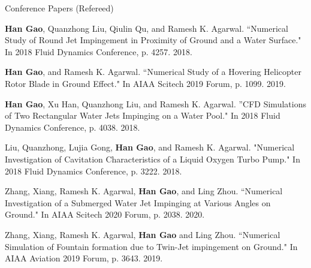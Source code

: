 \documentclass{resume} %
\begin{document}
\begin{rSection}{Conference Papers (Refereed)}

\item \textbf{Han Gao}, Quanzhong Liu, Qiulin Qu, and Ramesh K. Agarwal. ``Numerical Study of Round Jet Impingement in Proximity of Ground and a Water Surface." In 2018 Fluid Dynamics Conference, p. 4257. 2018.

\item \textbf{Han Gao}, and Ramesh K. Agarwal. ``Numerical Study of a Hovering Helicopter Rotor Blade in Ground Effect." In AIAA Scitech 2019 Forum, p. 1099. 2019.

\item \textbf{Han Gao}, Xu Han, Quanzhong Liu, and Ramesh K. Agarwal. ''CFD Simulations of Two Rectangular Water Jets Impinging on a Water Pool." In 2018 Fluid Dynamics Conference, p. 4038. 2018.

\item Liu, Quanzhong, Lujia Gong, \textbf{Han Gao}, and Ramesh K. Agarwal. "Numerical Investigation of Cavitation Characteristics of a Liquid Oxygen Turbo Pump." In 2018 Fluid Dynamics Conference, p. 3222. 2018.

\item Zhang, Xiang, Ramesh K. Agarwal, \textbf{Han Gao}, and Ling Zhou. ``Numerical Investigation of a Submerged Water Jet Impinging at Various Angles on Ground." In AIAA Scitech 2020 Forum, p. 2038. 2020.

\item Zhang, Xiang, Ramesh K. Agarwal, \textbf{Han Gao} and Ling Zhou. ``Numerical Simulation of Fountain formation due to Twin-Jet impingement on Ground." In AIAA Aviation 2019 Forum, p. 3643. 2019.
\end{rSection}
\end{document}
